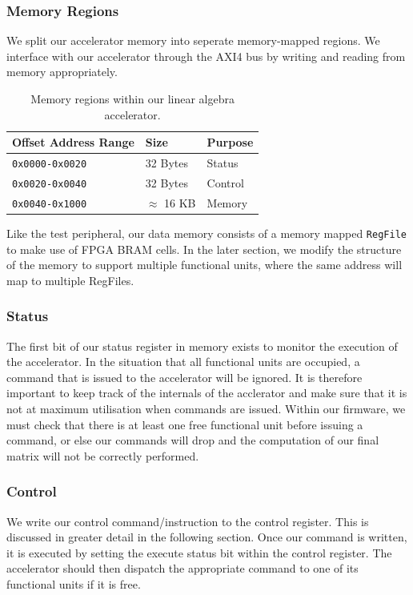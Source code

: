 \documentclass[a4paper,8pt]{report}
\begin{document}
\subsubsection{Memory Regions}
We split our accelerator memory into seperate memory-mapped regions. We
interface with our accelerator through the AXI4 bus by writing and reading from
memory appropriately.  
\begin{table}[h]
  \centering
  \begin{tabular}{lll}
    \toprule
    Offset Address Range & Size & Purpose \\
    \midrule
    \texttt{0x0000-0x0020} & 32 Bytes & Status \\
    \texttt{0x0020-0x0040} & 32 Bytes & Control \\
    \texttt{0x0040-0x1000} & $\approx$ 16 KB & Memory \\
    \bottomrule
  \end{tabular}
  \caption{Memory regions within our linear algebra accelerator.}
\end{table}

Like the test peripheral, our data memory consists of a memory mapped
\texttt{RegFile} to make use of FPGA BRAM cells. In the later section, we modify
the structure of the memory to support multiple functional units, where the same
address will map to multiple RegFiles.

\subsubsection{Status}
The first bit of our status register in memory exists to monitor the execution
of the accelerator. In the situation that all functional units are occupied, a
command that is issued to the accelerator will be ignored. It is therefore
important to keep track of the internals of the acclerator and make sure that it
is not at maximum utilisation when commands are issued. Within our firmware, we
must check that there is at least one free functional unit before issuing a
command, or else our commands will drop and the computation of our final matrix
will not be correctly performed.

\subsubsection{Control}
We write our control command/instruction to the control register. This is
discussed in greater detail in the following section. Once our command is
written, it is executed by setting the execute status bit within the control
register. The accelerator should then dispatch the appropriate command to one of
its functional units if it is free.
\end{document}
